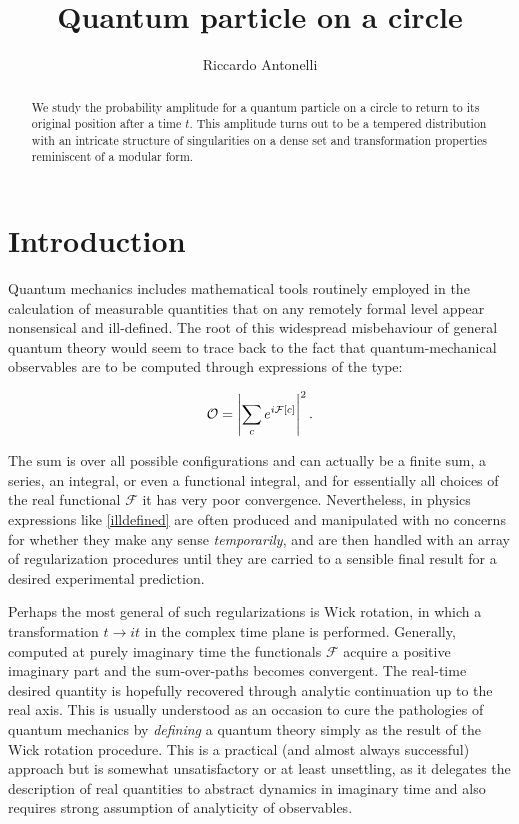 \documentclass{article}
\title{Quantum particle on a circle}
\author{Riccardo Antonelli}
\begin{document}
\maketitle

\begin{abstract}
    We study the probability amplitude for a quantum particle on a circle to return to its original position after a time $t$. This amplitude turns out to be a tempered distribution with an intricate structure of singularities on a dense set and transformation properties reminiscent of a modular form.
\end{abstract}

\tableofcontents

\section{Introduction}

Quantum mechanics includes mathematical tools routinely employed in the calculation of measurable quantities that on any remotely formal level appear nonsensical and ill-defined. The root of this widespread misbehaviour of general quantum theory would seem to trace back to the fact that quantum-mechanical observables are to be computed through expressions of the type:

\begin{equation}\label{illdefined}
    \mathcal{O} = \abs{ \sum_{c} e^{i\mathcal{F}[c]} }^2\,.
\end{equation}

The sum is over all possible configurations and can actually be a finite sum, a series, an integral, or even a functional integral, and for essentially all choices of the real functional $\mathcal{F}$ it has very poor convergence. Nevertheless, in physics expressions like \eqref{illdefined} are often produced and manipulated with no concerns for whether they make any sense \emph{temporarily}, and are then handled with an array of regularization procedures until they are carried to a sensible final result for a desired experimental prediction.

Perhaps the most general of such regularizations is Wick rotation, in which a transformation $t \rightarrow it$ in the complex time plane is performed. Generally, computed at purely imaginary time the functionals $\mathcal{F}$ acquire a positive imaginary part and the sum-over-paths becomes convergent. The real-time desired quantity is hopefully recovered through analytic continuation up to the real axis. This is usually understood as an occasion to cure the pathologies of quantum mechanics by \emph{defining} a quantum theory simply as the result of the Wick rotation procedure. This is a practical (and almost always successful) approach but is somewhat unsatisfactory or at least unsettling, as it delegates the description of real quantities to abstract dynamics in imaginary time and also requires strong assumption of analyticity of observables.
\end{document}
